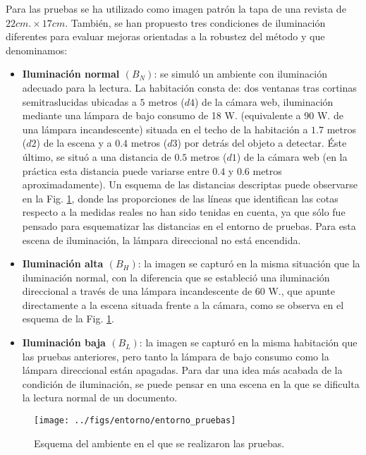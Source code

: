   Para las pruebas se ha utilizado como imagen patrón la tapa de una revista de $22cm. \times 17cm.$ También, se han propuesto tres condiciones de iluminación diferentes para evaluar mejoras orientadas a la robustez del método %
  y que denominamos: 
  \begin{itemize}
  \item \textbf{Iluminación normal $(B_{N})$}: se simuló un ambiente con iluminación adecuado para la lectura. La habitación consta de: dos ventanas tras cortinas semitraslucidas ubicadas a $5$ metros ($d4$) de la cámara web, iluminación mediante una lámpara de bajo consumo de 18 W. (equivalente a 90 W. de una lámpara incandescente) situada en el techo de la habitación a $1.7$ metros ($d2$) de la escena y a $0.4$ metros ($d3$) por detrás del objeto a detectar. Éste último, se situó a una distancia de $0.5$ metros ($d1$) de la cámara web (en la práctica esta distancia puede variarse entre $0.4$ y $0.6$ metros aproximadamente). Un esquema de las distancias descriptas puede observarse en la Fig. \ref{fig:entorno_pruebas}, donde las proporciones de las líneas que identifican las cotas respecto a la medidas reales no han sido tenidas en cuenta, ya que sólo fue pensado para esquematizar las distancias en el entorno de pruebas. Para esta escena de iluminación, la lámpara direccional no está encendida.
  \item \textbf{Iluminación alta $(B_{H})$}: la imagen se capturó en la misma situación que la iluminación normal, con la diferencia que se estableció una iluminación direccional a través de una lámpara incandescente de 60 W., que apunte directamente a la escena situada frente a la cámara, como se observa en el esquema de la Fig. \ref{fig:entorno_pruebas}. %
  \item \textbf{Iluminación baja $(B_{L})$}: la imagen se capturó en la misma habitación que las pruebas anteriores, pero tanto la lámpara de bajo consumo como la lámpara direccional están apagadas. Para dar una idea más acabada de la condición de iluminación, se puede pensar en una escena en la que se dificulta la lectura normal de un documento.
  \end{itemize}
  \begin{figure}[tbhp]
    \centering
	  \texttt{[image: ../figs/entorno/entorno\_pruebas]}
      \caption[Esquema del ambiente en el que se realizaron las pruebas]{Esquema del ambiente en el que se realizaron las pruebas.}
    \label{fig:entorno_pruebas}
  \end{figure}
